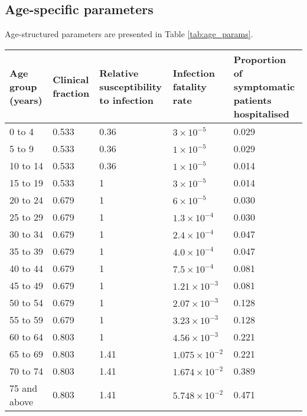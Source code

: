 \subsection{Age-specific parameters}

Age-structured parameters are presented in Table \ref{tab:age_params}.

\begin{table}
    \begin{threeparttable}
    \begin{tabular}{| p{2cm} | p{2.5cm} | p{3cm} | p{3cm} | p{2.5cm}|}
    \hline
        Age group (years) & Clinical fraction\tnote{a} & 
        Relative susceptibility to infection & Infection fatality rate & 
        Proportion of symptomatic patients hospitalised \\
        \hline
        0 to 4 & 0.533 & 0.36 & $3\times10^{-5}$ & 0.029 \\
        \hline
        5 to 9 & 0.533 & 0.36 & $1\times10^{-5}$ & 0.029 \\
        \hline
        10 to 14 & 0.533 & 0.36 & $1\times10^{-5}$ & 0.014 \\
        \hline
        15 to 19 & 0.533 & 1 & $3\times10^{-5}$ & 0.014 \\
        \hline
        20 to 24 & 0.679 & 1 & $6\times10^{-5}$ & 0.030 \\
        \hline
        25 to 29 & 0.679 & 1 & $1.3\times10^{-4}$ & 0.030 \\
        \hline
        30 to 34 & 0.679 & 1 & $2.4\times10^{-4}$ & 0.047 \\
        \hline
        35 to 39 & 0.679 & 1 & $4.0\times10^{-4}$ & 0.047 \\
        \hline
        40 to 44 & 0.679 & 1 & $7.5\times10^{-4}$ & 0.081 \\
        \hline
        45 to 49 & 0.679 & 1 & $1.21\times10^{-3}$ & 0.081 \\
        \hline
        50 to 54 & 0.679 & 1 & $2.07\times10^{-3}$ & 0.128 \\
        \hline
        55 to 59 & 0.679 & 1 & $3.23\times10^{-3}$ & 0.128 \\
        \hline
        60 to 64 & 0.803 & 1 & $4.56\times10^{-3}$ & 0.221 \\
        \hline
        65 to 69 & 0.803 & 1.41 & $1.075\times10^{-2}$ & 0.221 \\
        \hline
        70 to 74 & 0.803 & 1.41 & $1.674\times10^{-2}$ & 0.389 \\
        \hline
        75 and above & 0.803 & 1.41 & $5.748\times10^{-2}$\tnote{b} & 0.471 \\

\end{tabular}
\end{threeparttable}
\end{table}
